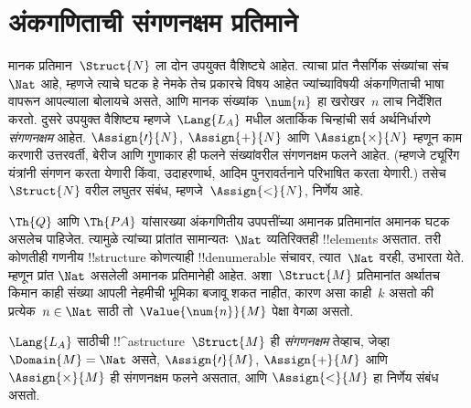 \documentclass[../../../include/open-logic-section]{subfiles}
\begin{document}
\section{अंकगणिताची संगणनक्षम प्रतिमाने}

\begin{explain}
मानक प्रतिमान~$\Struct{N}$ ला दोन उपयुक्त वैशिष्ट्ये आहेत. त्याचा प्रांत
नैसर्गिक संख्यांचा संच~$\Nat$ आहे, म्हणजे त्याचे घटक हे नेमके तेच प्रकारचे
विषय आहेत ज्यांच्याविषयी अंकगणिताची भाषा वापरून आपल्याला बोलायचे असते, आणि
मानक संख्यांक~$\num{n}$ हा खरोखर~$n$ लाच निर्देशित करतो. दुसरे उपयुक्त
वैशिष्ट्य म्हणजे~$\Lang{L_A}$ मधील अतार्किक चिन्हांची सर्व अर्थनिर्धारणे
\emph{संगणनक्षम} आहेत. $\Assign{\prime}{N}$, $\Assign{+}{N}$ आणि
$\Assign{\times}{N}$ म्हणून काम करणारी उत्तरवर्ती, बेरीज आणि गुणाकार ही
फलने संख्यांवरील संगणनक्षम फलने आहेत. (म्हणजे ट्यूरिंग यंत्रांनी संगणन करता
येणारी किंवा, उदाहरणार्थ, आदिम पुनरावर्तनाने परिभाषित करता येणारी.) तसेच
$\Struct{N}$ वरील लघुतर संबंध, म्हणजे~$\Assign{<}{N}$, निर्णेय आहे.

$\Th{Q}$ आणि $\Th{PA}$ यांसारख्या अंकगणितीय उपपत्तींच्या अमानक प्रतिमानांत
अमानक घटक असलेच पाहिजेत. त्यामुळे त्यांच्या प्रांतांत सामान्यतः~$\Nat$
व्यतिरिक्तही !!{element}s असतात. तरी कोणतीही गणनीय !!{structure} कोणत्याही
!!{denumerable} संचावर, त्यात~$\Nat$ वरही, उभारता येते. म्हणून प्रांत
$\Nat$ असलेली अमानक प्रतिमानेही आहेत. अशा~$\Struct{M}$ प्रतिमानांत अर्थातच
किमान काही संख्या आपली नेहमीची भूमिका बजावू शकत नाहीत, कारण असा काही~$k$
असतो की प्रत्येक~$n \in \Nat$ साठी तो~$\Value{\num{n}}{M}$ पेक्षा
वेगळा असतो.
\end{explain}

\begin{defn}
$\Lang{L_A}$ साठीची !!^a{structure}~$\Struct{M}$ ही \emph{संगणनक्षम}
तेव्हाच, जेव्हा $\Domain{M} = \Nat$ असते, $\Assign{\prime}{M}$,
$\Assign{+}{M}$ आणि $\Assign{\times}{M}$ ही संगणनक्षम फलने असतात, आणि
$\Assign{<}{M}$ हा निर्णेय संबंध असतो.
\end{defn}
\end{document}
